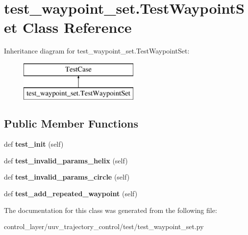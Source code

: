 \hypertarget{classtest__waypoint__set_1_1TestWaypointSet}{}\section{test\+\_\+waypoint\+\_\+set.\+Test\+Waypoint\+Set Class Reference}
\label{classtest__waypoint__set_1_1TestWaypointSet}
Inheritance diagram for test\+\_\+waypoint\+\_\+set.\+Test\+Waypoint\+Set\+:\begin{figure}[H]
\begin{center}
\leavevmode
\includegraphics[height=2.000000cm]{classtest__waypoint__set_1_1TestWaypointSet}
\end{center}
\end{figure}
\subsection*{Public Member Functions}
\begin{DoxyCompactItemize}
\item 
\mbox{\label{classtest__waypoint__set_1_1TestWaypointSet_a4b728a78dd7d055da6e70a5c94524977}} 
def {\bfseries test\+\_\+init} (self)
\item 
\mbox{\label{classtest__waypoint__set_1_1TestWaypointSet_aceb1fb56ea2121e128a3301568f90184}} 
def {\bfseries test\+\_\+invalid\+\_\+params\+\_\+helix} (self)
\item 
\mbox{\label{classtest__waypoint__set_1_1TestWaypointSet_a9ab3123c4d6f0d455dda2be8df2331ce}} 
def {\bfseries test\+\_\+invalid\+\_\+params\+\_\+circle} (self)
\item 
\mbox{\label{classtest__waypoint__set_1_1TestWaypointSet_a3590bf118e5e643d8ba67def623a6a86}} 
def {\bfseries test\+\_\+add\+\_\+repeated\+\_\+waypoint} (self)
\end{DoxyCompactItemize}


The documentation for this class was generated from the following file\+:\begin{DoxyCompactItemize}
\item 
control\+\_\+layer/uuv\+\_\+trajectory\+\_\+control/test/test\+\_\+waypoint\+\_\+set.\+py\end{DoxyCompactItemize}
